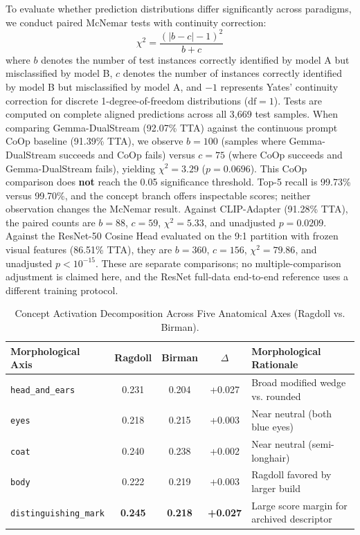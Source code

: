 \documentclass[conference]{IEEEtran}
\begin{document}
To evaluate whether prediction distributions differ significantly across paradigms, we conduct paired McNemar tests with continuity correction:
\begin{equation}
\chi^2 = \frac{(|b - c| - 1)^2}{b + c}
\end{equation}
where $b$ denotes the number of test instances correctly identified by model A but misclassified by model B, $c$ denotes the number of instances correctly identified by model B but misclassified by model A, and $-1$ represents Yates' continuity correction for discrete 1-degree-of-freedom distributions ($\text{df}=1$). Tests are computed on complete aligned predictions across all 3,669 test samples. When comparing Gemma-DualStream (92.07\% TTA) against the continuous prompt CoOp baseline (91.39\% TTA), we observe $b = 100$ (samples where Gemma-DualStream succeeds and CoOp fails) versus $c = 75$ (where CoOp succeeds and Gemma-DualStream fails), yielding $\chi^2 = 3.29$ ($p = 0.0696$). This CoOp comparison does \textbf{not} reach the 0.05 significance threshold. Top-5 recall is 99.73\% versus 99.70\%, and the concept branch offers inspectable scores; neither observation changes the McNemar result. Against CLIP-Adapter (91.28\% TTA), the paired counts are $b=88$, $c=59$, $\chi^2=5.33$, and unadjusted $p=0.0209$. Against the ResNet-50 Cosine Head evaluated on the 9:1 partition with frozen visual features (86.51\% TTA), they are $b=360$, $c=156$, $\chi^2=79.86$, and unadjusted $p<10^{-15}$. These are separate comparisons; no multiple-comparison adjustment is claimed here, and the ResNet full-data end-to-end reference uses a different training protocol.

\begin{table}[b]
\centering
\caption{Concept Activation Decomposition Across Five Anatomical Axes (Ragdoll vs. Birman).}
\label{tab:xai_ragdoll_birman}
\vspace{2pt}
\footnotesize
\setlength{\tabcolsep}{3pt}
\renewcommand{\arraystretch}{1.05}
\begin{tabularx}{\columnwidth}{p{2.3cm} c c c X}
\toprule
\textbf{Morphological Axis} & \textbf{Ragdoll} & \textbf{Birman} & \textbf{$\Delta$} & \textbf{Morphological Rationale} \\
\midrule
\texttt{head\_and\_ears} & 0.231 & 0.204 & +0.027 & Broad modified wedge vs. rounded \\
\texttt{eyes} & 0.218 & 0.215 & +0.003 & Near neutral (both blue eyes) \\
\texttt{coat} & 0.240 & 0.238 & +0.002 & Near neutral (semi-longhair) \\
\texttt{body} & 0.222 & 0.219 & +0.003 & Ragdoll favored by larger build \\
\texttt{distinguishing}\newline\texttt{\_mark} & \textbf{0.245} & \textbf{0.218} & \textbf{+0.027} & Large score margin for archived descriptor~\cite{cfa_ragdoll} \\
\bottomrule
\end{tabularx}
\end{table}
\end{document}
